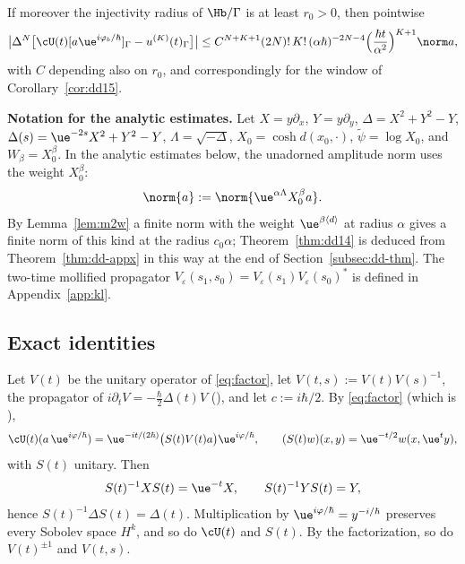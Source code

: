 \begin{corollaryR}\label{cor:dd16}
If moreover the injectivity radius of $\Hb/\Gamma$ is at least $r_0>0$, then pointwise
\[
\big|\Delta^N\big[\cU(t)[a\ue^{i\varphi_b/\hbar}]_\Gamma-u^{(K)}(t)_\Gamma\big]\big|\le C^{N+K+1}(2N)!\,K!\,(\alpha\hbar)^{-2N-4}\Big(\frac{\hbar t}{\alpha^2}\Big)^{K+1}\norm a ,
\]
with $C$ depending also on $r_0$, and correspondingly for the window of Corollary~\ref{cor:dd15}.
\end{corollaryR}

\medskip\noindent\textbf{Notation for the analytic estimates.}
Let $X=y\partial_x$, $Y=y\partial_y$, $\Delta=X^2+Y^2-Y$, $\Delta(s)=\ue^{-2s}X^2+Y^2-Y$,
$\Lambda=\sqrt{-\Delta}$, $X_0=\cosh d(x_0,\cdot)$, $\tilde\psi=\log X_0$, and $W_\beta=X_0^\beta$.
In the analytic estimates below, the unadorned amplitude norm uses the weight $X_0^\beta$:
\[
\norm{a}:=\norm{\ue^{\alpha\Lambda}X_0^\beta a}.
\]
By Lemma~\ref{lem:m2w} a finite norm with the weight $\ue^{\beta\langle d\rangle}$ at radius $\alpha$ gives a finite norm of this
kind at the radius $c_0\alpha$; Theorem~\ref{thm:dd14} is deduced from Theorem~\ref{thm:dd-appx} in this way at the end of
Section~\ref{subsec:dd-thm}. The two-time mollified propagator $V_\varepsilon(s_1,s_0)=V_\varepsilon(s_1)V_\varepsilon(s_0)^*$ is defined in
Appendix~\ref{app:kl}.

\subsection{Exact identities}\label{subsec:dd-id}

Let $V(t)$ be the unitary operator of \eqref{eq:factor}, let $V(t,s):=V(t)V(s)^{-1}$, the propagator of
$i\partial_tV=-\tfrac{\hbar}{2}\Delta(t)V$ (\cite[(1.22)]{S}), and let $c:=i\hbar/2$. By \eqref{eq:factor} (which is \cite[(1.23)]{S}),
\[
\cU(t)(a\,\ue^{i\varphi/\hbar})=\ue^{-it/(2\hbar)}\bigl(S(t)V(t)a\bigr)\ue^{i\varphi/\hbar},
\qquad (S(t)w)(x,y)=\ue^{-t/2}w(x,\ue^{t}y),
\]
with $S(t)$ unitary. Then
\[S(t)^{-1}XS(t)=\ue^{-t}X,\qquad S(t)^{-1}YS(t)=Y,\]
hence $S(t)^{-1}\Delta S(t)=\Delta(t)$.
Multiplication by $\ue^{i\varphi/\hbar}=y^{-i/\hbar}$ preserves every Sobolev space $H^k$, and so do $\cU(t)$ and $S(t)$.
By the factorization, so do $V(t)^{\pm1}$ and $V(t,s)$.

